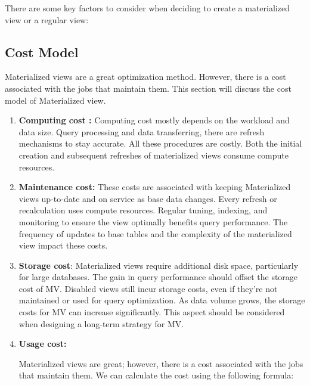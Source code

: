 There are some key factors to consider when deciding to create a materialized view or a regular view:\vspace{0.4cm}


\vspace{1cm}

 \subsection{Cost Model}
Materialized views are a great optimization method. However, there is a cost associated with the jobs that maintain them. This section will discuss the cost model of Materialized view.\vspace{.4cm}
 \begin{enumerate}[label=\alph*)]
    \item \textbf{Computing cost :} Computing cost mostly depends on the workload and data size. Query processing and data transferring, there are refresh mechanisms to stay accurate. All these procedures are costly. Both the initial creation and subsequent refreshes of materialized views consume compute resources.
    \item \textbf{Maintenance cost:} These costs are associated with keeping Materialized views up-to-date and on service as base data changes. Every refresh or recalculation uses compute resources. Regular tuning, indexing, and monitoring to ensure the view optimally benefits query performance. The frequency of updates to base tables and the complexity of the materialized view impact these costs. 
    \item \textbf{Storage cost}: Materialized views require additional disk space, particularly for large databases. The gain in query performance should offset the storage cost of MV. Disabled views still incur storage costs, even if they're not maintained or used for query optimization. As data volume grows, the storage costs for MV can increase significantly. This aspect should be considered when designing a long-term strategy for MV. 
    
    \item \textbf{Usage cost:}\vspace{.3cm}
    
    Materialized views are great; however, there is a cost associated with the jobs that maintain them. We can calculate the cost using the following formula: \cite{10.1145/2206869.2206874}

    
  
\end{enumerate}




